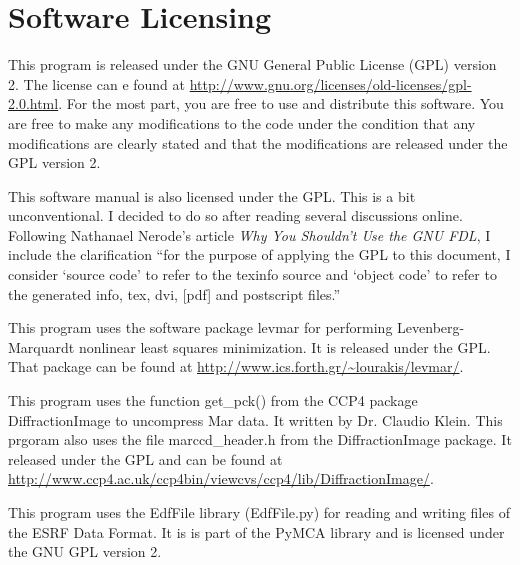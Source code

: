 \chapter{Software Licensing}

This program is released under the GNU General
Public License (GPL) version 2.
The license can e found at 
\url{http://www.gnu.org/licenses/old-licenses/gpl-2.0.html}.
For the most part, you are free to use and distribute 
this software. You are free to make any modifications to 
the code under the condition that any modifications are clearly 
stated and that the modifications are released under the 
GPL version 2.

This software manual is also licensed under the GPL. 
This is a bit unconventional. I decided to do so after reading
several discussions online. Following Nathanael Nerode's 
article {\em Why You Shouldn't Use the GNU FDL}, I include 
the clarification ``for the purpose of applying the GPL to 
this document, I consider `source code' to refer to the texinfo 
source and `object code' to refer to the generated info, tex, 
dvi, [pdf] and postscript files.''\cite{Nerode03}

This program uses the software package
levmar for performing Levenberg-Marquardt nonlinear
least squares minimization.
It is released under the GPL. That package can be 
found at \url{http://www.ics.forth.gr/~lourakis/levmar/}.\cite{lourakis04LM}

This program uses the function get\_pck() from the CCP4 package
DiffractionImage to uncompress Mar data. It
written by Dr. Claudio Klein.\cite{Klein95} 
This prgoram also uses the file marccd\_header.h from
the DiffractionImage package. It
released under the GPL and can be found at
\url{http://www.ccp4.ac.uk/ccp4bin/viewcvs/ccp4/lib/DiffractionImage/}.\cite{DiffractionImage}

This program uses the EdfFile library (EdfFile.py) for reading and 
writing files of the ESRF Data Format. It is is part of the PyMCA 
library and is licensed under the GNU GPL version 2.\cite{PyMCA}

